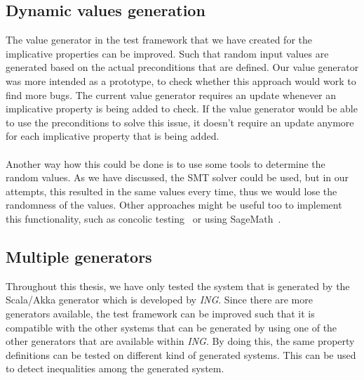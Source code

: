 \subsection*{Dynamic values generation}
The value generator in the test framework that we have created for the implicative properties can be improved. Such that random input values are generated based on the actual preconditions that are defined. Our value generator was more intended as a prototype, to check whether this approach would work to find more bugs. The current value generator requires an update whenever an implicative property is being added to check. If the value generator would be able to use the preconditions to solve this issue, it doesn't require an update anymore for each implicative property that is being added.\\
\\
Another way how this could be done is to use some tools to determine the random values. As we have discussed, the SMT solver could be used, but in our attempts, this resulted in the same values every time, thus we would lose the randomness of the values. Other approaches might be useful too to implement this functionality, such as concolic testing~\cite{sen2006cute} or using SageMath~\cite{siteSageMath2017}. %

\subsection*{Multiple generators}
Throughout this thesis, we have only tested the system that is generated by
the Scala/Akka generator which is developed by \textit{ING}. Since there are
more generators available, the test framework can be improved such that it is
compatible with the other systems that can be generated by using one of the
other generators that are available within \textit{ING}. By doing this, the same
property definitions can be tested on different kind of generated systems. This
can be used to detect inequalities among the generated system.

